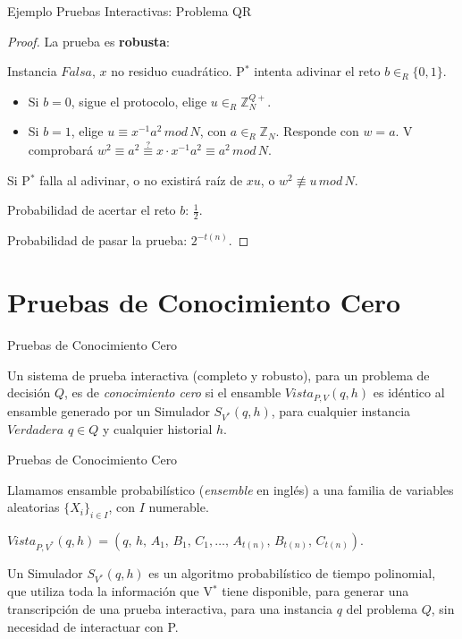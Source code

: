 \documentclass{beamer}
\begin{document}
\begin{frame}{Ejemplo Pruebas Interactivas: Problema QR}
\begin{proof}
	La prueba es \textbf{robusta}:
	
	Instancia $Falsa$, $x$ no residuo cuadrático.
	P$^*$ intenta adivinar el reto $b\in_R\{0,1\}$.
	\begin{itemize}
		\item Si $b=0$, sigue el protocolo, elige $u \in_R \mathbb{Z}^{Q+}_N$.
		
		\item Si $b=1$, elige $u \equiv x^{-1} a^2 \, mod \, N$, con $a \in_R \mathbb{Z}_N$.
		Responde con $w = a$.		
		V comprobará $w^2\equiv a^2 \overset{?}{\equiv} x\cdot x^{-1} a^2 \equiv a^2 \, mod \, N$.
	\end{itemize}

	Si P$^*$ falla al adivinar, o no existirá raíz de $xu$, o $w^2 \not \equiv u \, mod \, N$.
	
	Probabilidad de acertar el reto $b$: $\frac{1}{2}$.
	
	Probabilidad de pasar la prueba: $2^{-t(n)}$.
	
\end{proof}
\end{frame}



\section{Pruebas de Conocimiento Cero}

\begin{frame}{Pruebas de Conocimiento Cero}
	\begin{definition}
		Un sistema de prueba interactiva (completo y robusto), para un problema de decisión $Q$, es de \textit{conocimiento cero} si el ensamble $Vista_{P,V}(q,h)$ es idéntico al ensamble generado por un Simulador $S_{V^*}(q,h)$, para cualquier instancia $Verdadera$ $q\in Q$ y cualquier historial $h$.
	\end{definition}
\end{frame}




\begin{frame}{Pruebas de Conocimiento Cero}
	\begin{definition}[Ensamble]
		Llamamos ensamble probabilístico (\textit{ensemble} en inglés) a una familia de variables aleatorias $\{X_i\}_{i\in I}$, con $I$ numerable.
	\end{definition}
	$ Vista_{P,V^*}(q,h) = (q,\,h,\,A_1,\,B_1,\,C_1, \dots ,\,A_{t(n)},\,B_{t(n)},\,C_{t(n)}). $

	\begin{definition}[Simulador]
		Un Simulador $S_{V^*}(q,h)$ es un algoritmo probabilístico de tiempo polinomial, que utiliza toda la información que V$^*$ tiene disponible, para generar una transcripción de una prueba interactiva, para una instancia $q$ del problema $Q$, sin necesidad de interactuar con P.
	\end{definition}
\end{frame}
\end{document}
